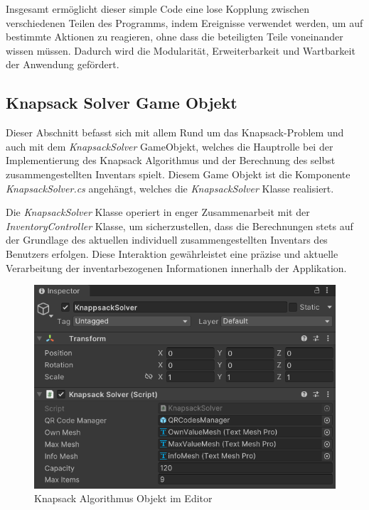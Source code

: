 Insgesamt ermöglicht dieser simple Code eine lose Kopplung zwischen verschiedenen Teilen des Programms, indem Ereignisse verwendet
werden, um auf bestimmte Aktionen zu reagieren, ohne dass die beteiligten Teile voneinander wissen müssen. Dadurch wird die
Modularität, Erweiterbarkeit und Wartbarkeit der Anwendung gefördert.

\subsection{Knapsack Solver Game Objekt}
Dieser Abschnitt befasst sich mit allem Rund um das Knapsack-Problem und auch mit dem  \textit{KnapsackSolver} GameObjekt,
welches die Hauptrolle bei der Implementierung des Knapsack Algorithmus und der Berechnung des selbst zusammengestellten
Inventars spielt. Diesem Game Objekt ist die Komponente \textit{KnapsackSolver.cs} angehängt, welches die \textit{KnapsackSolver}
Klasse realisiert.

Die \textit{KnapsackSolver} Klasse operiert in enger Zusammenarbeit mit der \textit{InventoryController} Klasse, um
sicherzustellen, dass die Berechnungen stets auf der Grundlage des aktuellen individuell zusammengestellten Inventars des
Benutzers erfolgen. Diese Interaktion gewährleistet eine präzise und aktuelle Verarbeitung der inventarbezogenen Informationen
innerhalb der Applikation.\\

\begin{figure}[H]
\centering
\includegraphics[scale=0.8]{images/knapsackEditor}
\caption{Knapsack Algorithmus Objekt im Editor}
\label{fig:Knapsack_Editor}
\end{figure}

